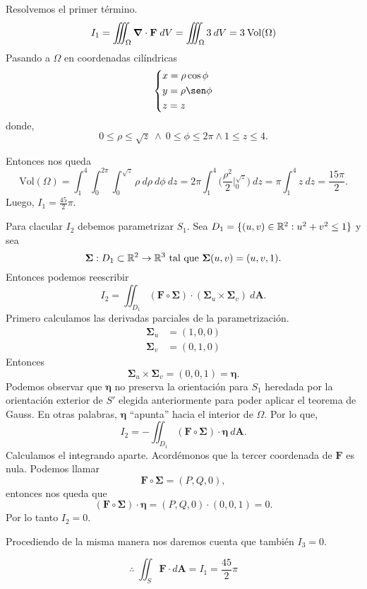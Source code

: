 \begin{solution}
    Resolvemos el primer t\'ermino.
    \begin{align*}
        I_1=\iiint _\Omega \grad \cdot \mathbf{F}\;dV = \iiint _\Omega3\:dV = 3\:\text{Vol}(\Omega)
    \end{align*}
    Pasando a  $\Omega$ en coordenadas cil\'indricas
    \[\begin{dcases}
            x=\rho \cos \phi \\
            y=\rho \sen \phi \\
            z=z
        \end{dcases}\] donde, $$0\leq\rho\leq \sqrt{z}\:\land\:0\leq\phi\leq 2\pi \land 1\leq z \leq 4.$$

    Entonces nos queda
    \[
        \text{Vol}(\Omega) =  \int_1^4  \int_0^{2\pi} \int_0^{\sqrt{z}}  \rho\:d\rho\:d\phi \:dz=2\pi  \int_1^4 \Big( \frac{\rho^2}{2}\Big|_0^{\sqrt{z}} \Big) \:dz =  \pi   \int_1^4   z  \:dz= \frac{15 \pi}{2}.
    \] Luego, $I_1 =  \frac{45}{2}\pi. $

    Para clacular $I_2$  debemos parametrizar $S_1$.  Sea  $D_1=\{(u,v)\in\mathbb{R}^2:u^2+v^2\leq1\}$ y  sea  $$\boldsymbol{\Sigma}:D_1\subset\mathbb{R}^2\to\mathbb{R}^3  \mbox{ tal que }   \boldsymbol{\Sigma}(u,v)=(u,v,1).$$
    Entonces podemos reescribir
    \[
        I_2=\iint _{D_1} (\mathbf{F}\circ\boldsymbol{\Sigma})\cdot
        (\boldsymbol{\Sigma}_u\times\boldsymbol{\Sigma}_v)\:d\mathbf{A}.
    \]
    Primero calculamos las derivadas parciales de la parametrizaci\'on.
    \begin{align*}
        \boldsymbol{\Sigma}_u & =(1,0,0) \\
        \boldsymbol{\Sigma}_v & =(0,1,0)
    \end{align*}
    Entonces
    \[
        \boldsymbol{\Sigma}_u\times\boldsymbol{\Sigma}_v=(0,0,1)=\boldsymbol{\eta}.
    \]
    Podemos observar que $\boldsymbol{\eta}$ no preserva la orientaci\'on  para $S_1$ heredada  por la orientaci\'on exterior de $S'$ elegida anteriormente para poder aplicar el teorema de Gauss. En otras palabras,  $\boldsymbol{\eta}$ ``apunta''  hacia el interior de $\Omega$.  Por lo que,
    \[
        I_2=-\iint _{D_1} (\mathbf{F}\circ\boldsymbol{\Sigma})\cdot \boldsymbol{\eta}\:d\mathbf{A}.
    \]
    Calculamos el integrando aparte. Acord\'emonos que la tercer coordenada de $\mathbf{F}$ es nula. Podemos llamar
    \[
        \mathbf{F}\circ\boldsymbol{\Sigma}=(P,Q,0),
    \]
    entonces nos queda que
    \[
        (\mathbf{F}\circ\boldsymbol{\Sigma})\cdot \boldsymbol{\eta}=(P,Q,0)\cdot (0,0,1)=0.
    \]
    Por lo tanto $I_2=0$.

    Procediendo de la misma manera nos daremos cuenta que tambi\'en $I_3=0$.

    $$\therefore\;\iint _{S} \mathbf{F}\cdot d\mathbf{A}=I_1=\frac{45}{2}\pi$$
\end{solution}

